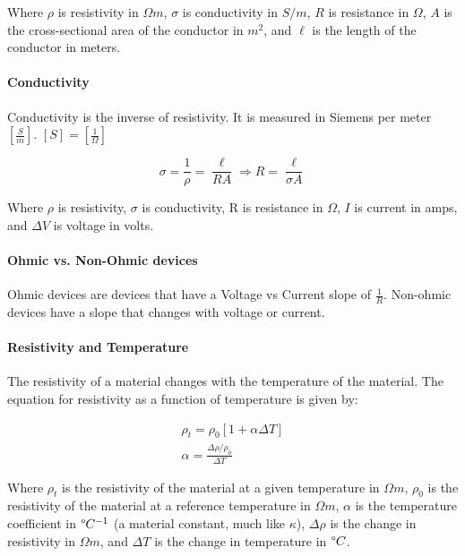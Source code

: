 Where $\rho$ is resistivity in $\Omega m$, $\sigma$ is conductivity in $S/m$, $R$ is resistance in $\Omega$, $A$ is the cross-sectional area of the 
conductor in $m^2$, and $\ell$ is the length of the conductor in meters.\\

\paragraph*{Conductivity}
Conductivity is the inverse of resistivity. It is measured in Siemens per meter $[\frac{S}{m}]$. $[S] = [\frac{1}{\Omega}]$

\begin{equation*}
    \sigma = \frac{1}{\rho} = \frac{\ell}{RA} \Longrightarrow R = \frac{\ell}{\sigma A}
\end{equation*}

Where $\rho$ is resistivity, $\sigma$ is conductivity, R is resistance in $\Omega$, $I$ is current in amps, and $\Delta V$ is voltage in volts.

\paragraph*{Ohmic vs. Non-Ohmic devices}
Ohmic devices are devices that have a Voltage vs Current slope of $\frac{1}{R}$. Non-ohmic devices have a slope that changes with voltage or current.

\paragraph*{Resistivity and Temperature}
The resistivity of a material changes with the temperature of the material. The equation for resistivity as a function of temperature is given by:

\begin{align*}
    \rho_t = \rho_0[1+\alpha\Delta T]\\
    \alpha = \frac{\Delta \rho/\rho_0}{\Delta T}
\end{align*}

Where $\rho_t$ is the resistivity of the material at a given temperature in $\Omega m$, $\rho_0$ is the resistivity of the material at a reference temperature in $\Omega m$, 
$\alpha$ is the temperature coefficient in $\degree C^{-1}$ (a material constant, much like $\kappa$), $\Delta \rho$ is the change in resistivity in $\Omega m$, 
and $\Delta T$ is the change in temperature in $\degree C$.

\hrulefill

